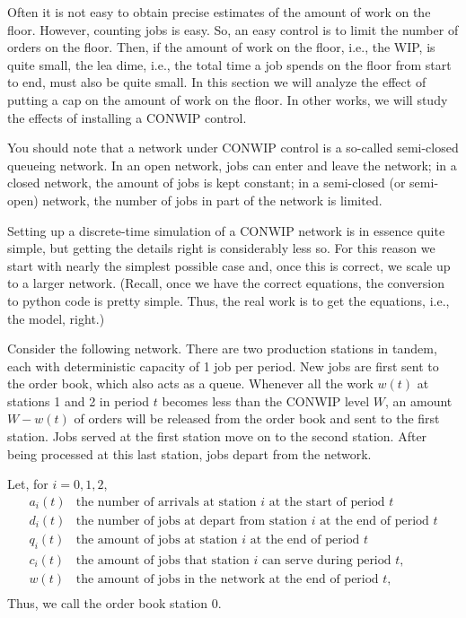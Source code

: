 Often it is not easy to obtain precise estimates of the amount of work on the floor.
However, counting jobs is easy.
So, an easy control is to limit the number of orders on the floor.
Then, if the amount of work on the floor, i.e., the WIP, is quite small, the lea dime, i.e., the total time a job spends on the floor from start to end, must also be quite small.
In this section we will analyze the effect of putting a cap on the amount of work on the floor.
In other works, we will study the effects of installing a CONWIP control.

You should note that a network under CONWIP control is a so-called semi-closed queueing network.
In an open network, jobs can enter and leave the network; in a closed network, the amount of jobs is kept constant; in a semi-closed (or semi-open) network, the number of jobs in part of the network is limited.

Setting up a discrete-time simulation of a CONWIP network is in essence quite simple, but getting the details right is considerably less so.
For this reason we start with nearly the simplest possible case and, once this is correct, we scale up to a larger network.
(Recall, once we have the correct equations, the conversion to python code is pretty simple.
Thus, the real work is to get the equations, i.e., the model, right.)

Consider the following network.
There are two production stations in tandem, each with deterministic capacity of 1 job per period.
New jobs are first sent to the order book, which also acts as a queue.
Whenever all the work $w(t)$ at stations 1 and 2 in period $t$ becomes less than the CONWIP level $W$, an amount $W-w(t)$ of orders will be released from the order book and sent to the first station.
Jobs served at the first station move on to the second station.
After being processed at this last station, jobs depart from the network.


Let, for $i=0, 1, 2$, 
\begin{align*}
a_i(t) & \text{the number of arrivals at station $i$  at the start of period $t$} \\
d_i(t) & \text{the number of jobs at depart from station $i$  at the end of period $t$} \\
q_i(t) & \text{the amount of jobs at station $i$  at the end of period $t$} \\
c_i(t) & \text{the amount of jobs that station $i$  can serve during  period $t$}, \\
w(t) & \text{the amount of jobs in the network at the end of period $t$}, \\
\end{align*}
Thus, we call the order book station $0$. 

